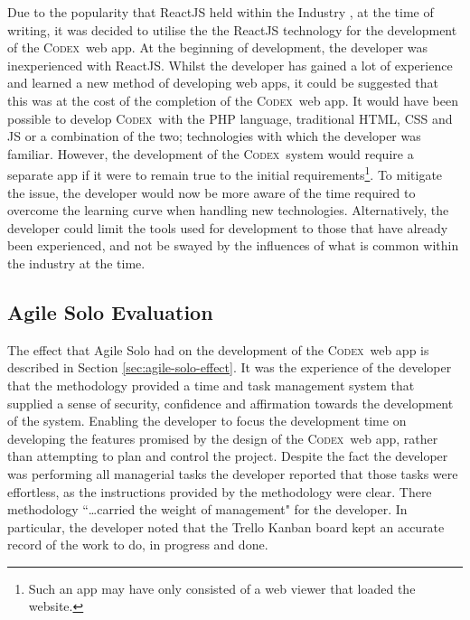 \documentclass[final]{cmpreport}
\newcommand{\Codex}{\textsc{Codex}}
\begin{document}
		Due to the popularity that ReactJS held within the Industry \citep{react-popularity}, at the time of writing, it was decided to utilise the the ReactJS technology for the development of the \Codex \ web app. At the beginning of development, the developer was inexperienced with ReactJS. Whilst the developer has gained a lot of experience and learned a new method of developing web apps, it could be suggested that this was at the cost of the completion of the \Codex \ web app. It would have been possible to develop \Codex \ with the PHP language, traditional HTML, CSS and JS or a combination of the two; technologies with which the developer was familiar. However, the development of the \Codex \ system would require a separate app if it were to remain true to the initial requirements\footnote{Such an app may have only consisted of a web viewer that loaded the website.}. To mitigate the issue, the developer would now be more aware of the time required to overcome the learning curve when handling new technologies. Alternatively, the developer could limit the tools used for development to those that have already been experienced, and not be swayed by the influences of what is common within the industry at the time.
			
		\subsection{Agile Solo Evaluation} \label{sec:agile-solo-eval}
		The effect that Agile Solo had on the development of the \Codex \ web app is described in Section \ref{sec:agile-solo-effect}. It was the experience of the developer that the methodology provided a time and task management system that supplied a sense of security, confidence and affirmation towards the development of the system. Enabling the developer to focus the development time on developing the features promised by the design of the \Codex \ web app, rather than attempting to plan and control the project. Despite the fact the developer was performing all managerial tasks the developer reported that those tasks were effortless, as the instructions provided by the methodology were clear. There methodology ``\ldots carried the weight of management" for the developer. In particular, the developer noted that the Trello Kanban board kept an accurate record of the work to do, in progress and done. 
		
\end{document}
